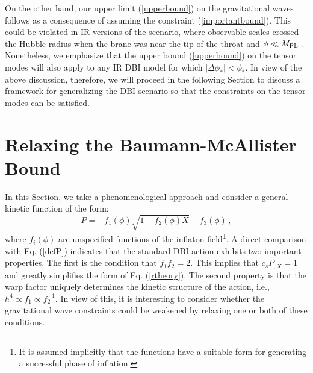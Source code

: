 On the other hand, 
our upper limit (\ref{upperbound}) on the gravitational waves 
follows as a consequence of assuming 
the constraint (\ref{importantbound}). This  
could be violated in IR versions of the scenario, where
observable scales crossed the Hubble radius when the 
brane was near the tip of the throat and $\phi \ll M_{\mathrm{PL}}$
\cite{brane12,brane14}. 
Nonetheless, we emphasize that the upper bound (\ref{upperbound})
on the tensor modes 
will also apply to any IR DBI model for which 
$|\Delta \phi_* | < \phi_*$.  
In view of the above discussion, therefore, 
we will proceed in the following Section
to discuss a framework for generalizing the DBI scenario so 
that the constraints on the tensor modes can be satisfied. 
% 
% 
% 
% 
\section{Relaxing the Baumann-McAllister Bound}
% 
\label{sec:satisfy}
% 
In this Section, we take a phenomenological 
approach and consider a general kinetic function of the form:
\begin{equation}
\label{genaction}
P= -f_1 (\phi ) \sqrt{1-f_2 (\phi ) X} -f_3 (\phi) \,,
\end{equation}
where $f_i (\phi )$ are unspecified functions of the inflaton 
field\footnote{It is assumed 
implicitly that the functions have a suitable form for 
generating a successful phase of inflation.}.
A direct comparison with Eq. (\ref{defP}) 
indicates that the standard DBI action exhibits two important properties. 
The first is the condition that $f_1 f_2 =2$. This implies that 
$c_sP_{,X} =1$ and greatly simplifies the form of Eq. (\ref{rtheory}). 
The second property is that the warp factor uniquely determines 
the kinetic structure of the action, i.e., $h^4 \propto f_1 \propto f_2^{-1}$.  
In view of this, it is interesting to consider whether
the gravitational wave constraints could be weakened by relaxing one 
or both of these conditions. 

